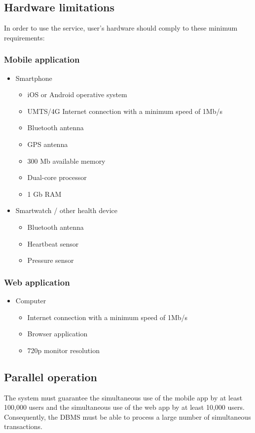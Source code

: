 \subsection{Hardware limitations}\label{hardwareLimitation}
In order to use the service, user’s hardware should comply to these minimum requirements:
\subsubsection{Mobile application}
\begin{itemize}
  \item Smartphone
  \begin{itemize}
    \item iOS or Android operative system
    \item UMTS/4G Internet connection with a minimum speed of 1Mb/s
    \item Bluetooth antenna
    \item GPS antenna
    \item 300 Mb available memory
    \item Dual-core processor
    \item 1 Gb RAM
  \end{itemize}
  \item Smartwatch / other health device
  \begin{itemize}
    \item Bluetooth antenna
    \item Heartbeat sensor
    \item Pressure sensor
  \end{itemize}
\end{itemize}

\subsubsection{Web application}
\begin{itemize}
  \item Computer
  \begin{itemize}
    \item Internet connection with a minimum speed of 1Mb/s
    \item Browser application
    \item 720p monitor resolution
  \end{itemize}
\end{itemize}

\subsection{Parallel operation}
The system must guarantee the simultaneous use of the mobile app by at least 100,000 users and the simultaneous use of the web app by at least 10,000 users.
Consequently, the DBMS must be able to process a large number of simultaneous transactions.

